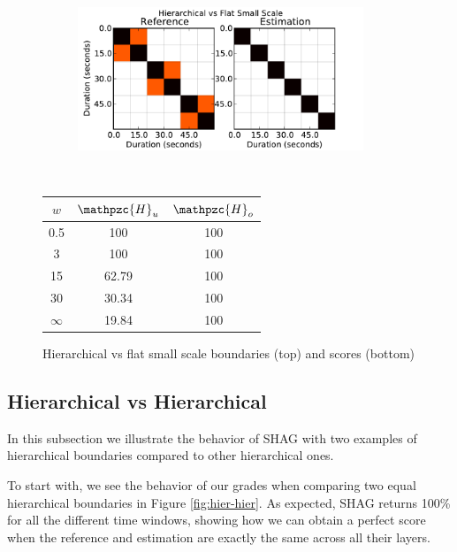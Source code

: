 \documentclass{article}
\begin{document}
\begin{figure}
  \centering
  \begin{subfigure}{0.5\textwidth}
    \centering
    \includegraphics[width=0.94\textwidth]{plots/hier-flatsmall.pdf}
  \end{subfigure}%
  \\
  \begin{minipage}{0.5\textwidth}
    \centering
    \vspace{10pt}
    \begin{tabular}{|c|c|c|}
      \hline
      $w$       & $\mathpzc{H}_u$    & $\mathpzc{H}_o$      \\
      \hline
      0.5       & 100       & 100      \\     
      3         & 100       & 100      \\
      15        & 62.79     & 100    \\
      30        & 30.34     & 100    \\
      $\infty$  & 19.84     & 100    \\
      \hline
    \end{tabular}
  \end{minipage}
  \caption{Hierarchical vs flat small scale boundaries (top) and scores (bottom)}
  \label{fig:hier-flatsmall}
\end{figure}

\subsection{Hierarchical vs Hierarchical}

In this subsection we illustrate the behavior of SHAG with two examples of hierarchical boundaries compared to other hierarchical ones.

To start with, we see the behavior of our grades when comparing two equal hierarchical boundaries in Figure \ref{fig:hier-hier}.
As expected, SHAG returns 100\% for all the different time windows, showing how we can obtain a perfect score when the reference and estimation are exactly the same across all their layers.
\end{document}
